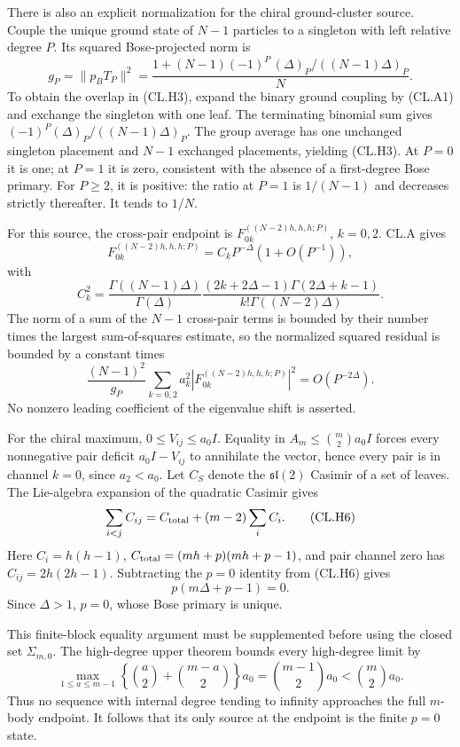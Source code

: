 There is also an explicit normalization for the chiral ground-cluster source. Couple the unique ground state of \(N-1\) particles to a singleton with left relative degree \(P\). Its squared Bose-projected norm is \[
g_P=\|p_BT_P\|^2
=\frac{1+(N-1)(-1)^P\,(\Delta)_P/((N-1)\Delta)_P}{N}.
\tag{CL.H3}
\] To obtain the overlap in (CL.H3), expand the binary ground coupling by (CL.A1) and exchange the singleton with one leaf. The terminating binomial sum gives \((-1)^P(\Delta)_P/((N-1)\Delta)_P\). The group average has one unchanged singleton placement and \(N-1\) exchanged placements, yielding (CL.H3). At \(P=0\) it is one; at \(P=1\) it is zero, consistent with the absence of a first-degree Bose primary. For \(P\geq2\), it is positive: the ratio at \(P=1\) is \(1/(N-1)\) and decreases strictly thereafter. It tends to \(1/N\).

For this source, the cross-pair endpoint is \(F_{0k}^{((N-2)h,h,h;P)}\), \(k=0,2\). CL.A gives \[
F_{0k}^{((N-2)h,h,h;P)}
=C_kP^{-\Delta}(1+O(P^{-1})),
\] with \[
C_k^2=
\frac{\Gamma((N-1)\Delta)}{\Gamma(\Delta)}
\frac{(2k+2\Delta-1)\Gamma(2\Delta+k-1)}
{k!\Gamma((N-2)\Delta)}.
\tag{CL.H4}
\] The norm of a sum of the \(N-1\) cross-pair terms is bounded by their number times the largest sum-of-squares estimate, so the normalized squared residual is bounded by a constant times \[
\frac{(N-1)^2}{g_P}
\sum_{k=0,2}a_k^2|F_{0k}^{((N-2)h,h,h;P)}|^2
=O(P^{-2\Delta}).
\tag{CL.H5}
\] No nonzero leading coefficient of the eigenvalue shift is asserted.

For the chiral maximum, \(0\leq V_{ij}\leq a_0I\). Equality in \(A_m\leq\binom m2a_0I\) forces every nonnegative pair deficit \(a_0I-V_{ij}\) to annihilate the vector, hence every pair is in channel \(k=0\), since \(a_2<a_0\). Let \(C_S\) denote the \(\mathfrak{sl}(2)\) Casimir of a set of leaves. The Lie-algebra expansion of the quadratic Casimir gives \[
\sum_{i<j}C_{ij}=C_{\rm total}+(m-2)\sum_iC_i.
\tag{CL.H6}
\] Here \(C_i=h(h-1)\), \(C_{\rm total}=(mh+p)(mh+p-1)\), and pair channel zero has \(C_{ij}=2h(2h-1)\). Subtracting the \(p=0\) identity from (CL.H6) gives \[
p(m\Delta+p-1)=0.
\] Since \(\Delta>1\), \(p=0\), whose Bose primary is unique.

This finite-block equality argument must be supplemented before using the closed set \(\Sigma_{m,0}\). The high-degree upper theorem bounds every high-degree limit by \[
\max_{1\leq a\leq m-1}
\left\{\binom a2+\binom{m-a}{2}\right\}a_0
=\binom{m-1}{2}a_0
<\binom m2a_0.
\tag{CL.H7}
\] Thus no sequence with internal degree tending to infinity approaches the full \(m\)-body endpoint. It follows that its only source at the endpoint is the finite \(p=0\) state.


